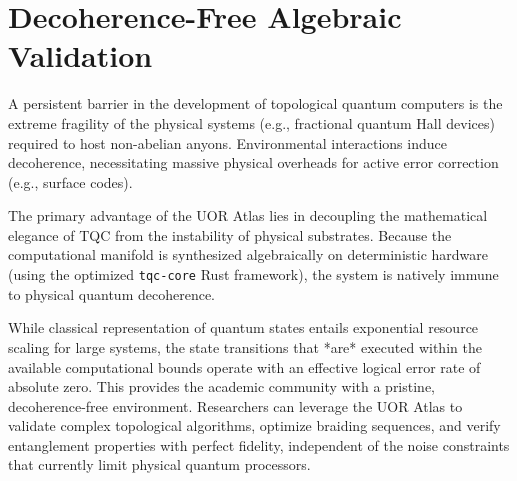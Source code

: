 \section{Decoherence-Free Algebraic Validation}

A persistent barrier in the development of topological quantum computers is the extreme fragility of the physical systems (e.g., fractional quantum Hall devices) required to host non-abelian anyons. Environmental interactions induce decoherence, necessitating massive physical overheads for active error correction (e.g., surface codes).

The primary advantage of the UOR Atlas lies in decoupling the mathematical elegance of TQC from the instability of physical substrates. Because the computational manifold is synthesized algebraically on deterministic hardware (using the optimized \texttt{tqc-core} Rust framework), the system is natively immune to physical quantum decoherence. 

While classical representation of quantum states entails exponential resource scaling for large systems, the state transitions that *are* executed within the available computational bounds operate with an effective logical error rate of absolute zero. This provides the academic community with a pristine, decoherence-free environment. Researchers can leverage the UOR Atlas to validate complex topological algorithms, optimize braiding sequences, and verify entanglement properties with perfect fidelity, independent of the noise constraints that currently limit physical quantum processors.
